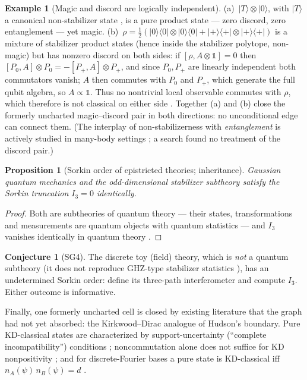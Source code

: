\documentclass[11pt,a4paper]{article}
\newtheorem{proposition}{Proposition}
\theoremstyle{definition}
\newtheorem{example}{Example}
\newtheorem{conjecture}{Conjecture}
\newcommand{\ket}[1]{\lvert #1 \rangle}
\newcommand{\proj}[1]{\lvert #1 \rangle\!\langle #1 \rvert}
\newcommand{\id}{\mathbb{1}}
\begin{document}
\begin{example}[Magic and discord are logically independent]\label{ex:r4}
(a)~$\ket{T}\otimes\ket{0}$, with $\ket{T}$ a canonical non-stabilizer state
\cite{bravyi2005}, is a pure product state --- zero discord, zero entanglement
--- yet magic. (b)~$\rho=\tfrac12(\proj{0}\otimes\proj{0}+\proj{+}\otimes\proj{+})$
is a mixture of stabilizer product states (hence inside the stabilizer
polytope, non-magic) but has nonzero discord on both sides: if
$[\rho,A\otimes\id]=0$ then $[P_0,A]\otimes P_0=-[P_+,A]\otimes P_+$, and since
$P_0,P_+$ are linearly independent both commutators vanish; $A$ then commutes
with $P_0$ and $P_+$, which generate the full qubit algebra, so
$A\propto\id$. Thus no nontrivial local observable commutes with $\rho$, which
therefore is not classical on either side \cite{ollivier2001,henderson2001}.
Together (a) and (b) close the formerly uncharted magic--discord pair in both
directions: no unconditional edge can connect them. (The interplay of
non-stabilizerness with \emph{entanglement} is actively studied in many-body
settings \cite{frau2024}; a search found no treatment of the discord pair.)
\end{example}

\begin{proposition}[Sorkin order of epistricted theories;
inheritance]\label{prop:r6}
Gaussian quantum mechanics and the odd-dimensional stabilizer subtheory
satisfy the Sorkin truncation $I_3=0$ identically.
\end{proposition}
\begin{proof}
Both are subtheories of quantum theory --- their states, transformations and
measurements are quantum objects with quantum statistics
\cite{brs2012,gross2006} --- and $I_3$ vanishes identically in quantum theory
\cite{sorkin1994}.
\end{proof}

\begin{conjecture}[SG4]
The discrete toy (field) theory, which is \emph{not} a quantum subtheory
(it does not reproduce GHZ-type stabilizer statistics
\cite{spekkens2007,catani2017}), has an undetermined Sorkin order: define its
three-path interferometer and compute $I_3$. Either outcome is informative.
\end{conjecture}

Finally, one formerly uncharted cell is closed by existing literature that the
graph had not yet absorbed: the Kirkwood--Dirac analogue of Hudson's boundary.
Pure KD-classical states are characterized by support-uncertainty
(``complete incompatibility'') conditions \cite{debievre2021}; noncommutation
alone does not suffice for KD nonpositivity \cite{ady2021}; and for discrete-Fourier
bases a pure state is KD-classical iff $n_A(\psi)\,n_B(\psi)=d$ \cite{xu2022}.
\end{document}
